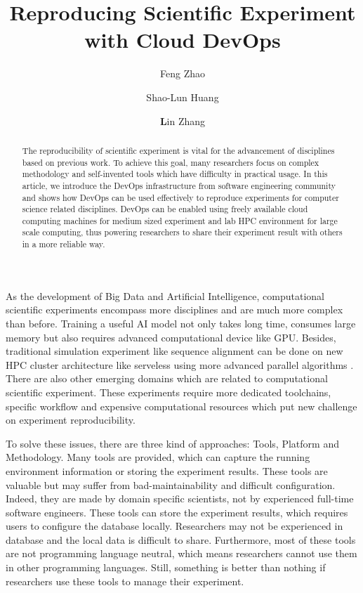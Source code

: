 \documentclass{IEEEcsmag}
\begin{document}

\title{Reproducing Scientific Experiment with Cloud DevOps}

\author{Feng Zhao}

\author{Shao-Lun Huang}

\author{\textbf{L}in Zhang}


\begin{abstract}
The reproducibility of scientific experiment is vital for the advancement of disciplines based on previous work. To achieve this goal, many researchers focus on complex methodology and self-invented tools which have difficulty in practical usage. In this article, we introduce the DevOps infrastructure from software engineering community and shows how DevOps can be used effectively to reproduce experiments for computer science related disciplines. DevOps can be enabled using freely available cloud computing machines for medium sized experiment and lab HPC environment for large scale computing, thus powering researchers to share their experiment result with others in a more reliable way.
\end{abstract}

\maketitle

 As the development of Big Data and Artificial Intelligence, computational scientific experiments encompass more disciplines and are much more complex than before. Training a useful AI model not only takes long time, consumes large memory but also requires advanced computational device like GPU. Besides, traditional simulation experiment like sequence alignment can be done on new HPC cluster architecture like serveless using more advanced parallel algorithms \cite{niu2019leveraging}. There are also other emerging domains which are related to computational scientific experiment. These experiments require more dedicated toolchains, specific workflow and expensive computational resources which put new challenge on experiment reproducibility.

To solve these issues, there are three kind of approaches: Tools, Platform and Methodology. Many tools \cite{greff2017sacred} are provided, which can capture the running environment information or storing the experiment results. These tools are valuable but may suffer from bad-maintainability and difficult configuration. Indeed, they are made by domain specific scientists, not by experienced full-time software engineers. These tools can store the experiment results, which requires users to configure the database locally. Researchers may not be experienced in database and the local data is difficult to share. Furthermore, most of these tools are not programming language neutral, which means researchers cannot use them in other programming languages. Still, something is better than nothing if researchers use these tools to manage their experiment.
\end{document}
